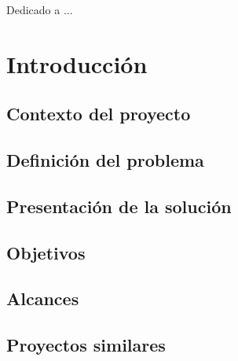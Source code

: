 \documentclass{iccmemoria}
\author{Yorch Sepúlveda}
\date{Enero, 2019}
\begin{document}
\maketitle

\begin{dedicatory}
Dedicado a ...
\end{dedicatory}



\tableofcontents
\listoffigures
\listoftables




\chapter{Introducción}
	

	\section{Contexto del proyecto}
	

	\section{Definición del problema}
	

	\section{Presentación de la solución}
	

	\section{Objetivos}
	

	\section{Alcances}
	

	\section{Proyectos similares}
	
\end{document}
